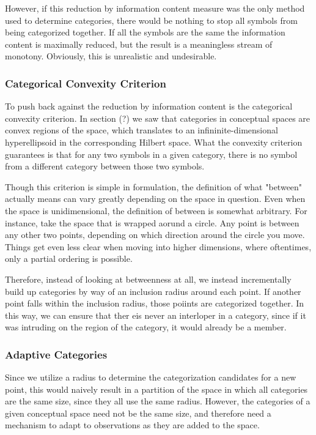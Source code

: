 \documentclass[runningheads]{llncs}
\begin{document}
However, if this reduction by information content measure was the only method used to determine categories, there would be nothing to stop all symbols from being categorized together.  If all the symbols are the same the information content is maximally reduced, but the result is a meaningless stream of monotony.  Obviously, this is unrealistic and undesirable.

\subsubsection{Categorical Convexity Criterion}
To push back against the reduction by information content is the categorical convexity criterion.  In section (?) we saw that categories in conceptual spaces are convex regions of the space, which translates to an infininite-dimensional hyperellipsoid in the corresponding Hilbert space.  What the convexity criterion guarantees is that for any two symbols in a given category, there is no symbol from a different category between those two symbols.

Though this criterion is simple in formulation, the definition of what "between" actually means can vary greatly depending on the space in question.  Even when the space is unidimensional, the definition of between is somewhat arbitrary.  For instance, take the space that is wrapped aorund a circle.  Any point is between any other two points, depending on which direction around the circle you move.  Things get even less clear when moving into higher dimensions, where oftentimes, only a partial ordering is possible.

Therefore, instead of looking at betweenness at all, we instead incrementally build up categories by way of an inclusion radius around each point.  If another point falls within the inclusion radius, those poiints are categorized together.  In this way, we can ensure that ther eis never an interloper in a category, since if it was intruding on the region of the category, it would already be a member.

\subsubsection{Adaptive Categories}

Since we utilize a radius to determine the categorization candidates for a new point, this would naively result in a partition of the space in which all categories are the same size, since they all use the same radius.  However, the categories of a given conceptual space need not be the same size, and therefore need a mechanism to adapt to observations as they are added to the space.
\end{document}
